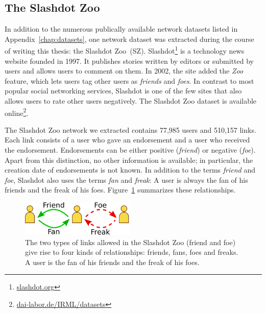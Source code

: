 \documentclass[11pt,a4paper]{book}
\newcommand{\wTwo}{0.48}
\begin{document}
\subsection{The Slashdot Zoo}
\label{sec:zoo}

In addition to the numerous publically available network datasets listed
in Appendix~\ref{chap:datasets}, one network dataset was extracted
during the course of writing this thesis: the Slashdot Zoo~(\textsf{SZ}).
Slashdot\footnote{\href{http://slashdot.org/}{slashdot.org}} is a
technology news website founded in 1997.  It publishes stories written
by editors or submitted by users and allows users to comment on them.
In 2002, the site added the \emph{Zoo} feature, which lets users tag
other users as \emph{friends} and \emph{foes}.  In contrast to most
popular social networking services, Slashdot is one of the few sites
that also allows users to rate other users negatively.  
The Slashdot Zoo dataset is available
online\footnote{\href{http://dai-labor.de/IRML/datasets}{dai-labor.de/IRML/datasets}}.


The Slashdot Zoo network we extracted contains 77,985 users and 510,157
links.  Each link consists of a user who gave an endorsement and a user
who received the endorsement.  Endorsements can be either positive
(\emph{friend}) or negative (\emph{foe}).  Apart from this distinction, no
other information is available; in particular, the creation date of
endorsements is not known.
In addition to the terms \emph{friend} and \emph{foe}, Slashdot also uses the
terms \emph{fan} and \emph{freak}:  A user is always the fan of his friends
and the freak of his foes.  Figure~\ref{fig:ffff} summarizes these
relationships. 

\begin{figure}[h!]
  \centering
  \includegraphics[width=\wTwo\textwidth]{img-svg/friends-foes}
  \caption{
    The two types of links allowed in the Slashdot Zoo (friend and foe)
    give rise to four kinds of relationships: friends, fans, foes and
    freaks.  A user is the fan of his friends and the freak of his foes.
  }
  \label{fig:ffff}
\end{figure}
\end{document}
